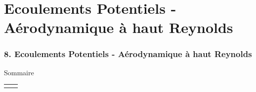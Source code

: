 
\part{Ecoulements Potentiels - Aérodynamique à haut Reynolds}


\section*{\bfseries 8. Ecoulements Potentiels - Aérodynamique à haut Reynolds}









\begin{frame}{Sommaire}

\small
  
\hspace*{2mm}
\begin{tabular}{cc}
  		\begin{minipage}{62mm}
  			\tableofcontents[firstsection=-6]
      \vspace{15mm}
  		\end{minipage}
  		&   
  		\begin{minipage}{60cm}
		  \vspace*{-5mm}  
  		\end{minipage}
  	\end{tabular}

\vspace{0mm}

\end{frame}


